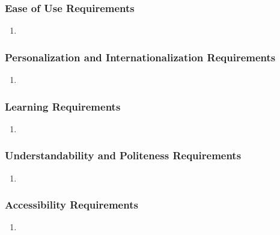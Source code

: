 \documentclass[]{article}
\begin{document}
\subsubsection{Ease of Use Requirements}
\label{ssub:ease_of_use_requirements}
\begin{enumerate}[{UH}1. ]
	\item 
\end{enumerate}

\subsubsection{Personalization and Internationalization Requirements}
\label{ssub:personalization_and_internationalization_requirements}
\begin{enumerate}[{UH}1. ]
	\item 
\end{enumerate}

\subsubsection{Learning Requirements}
\label{ssub:learning_requirements}
\begin{enumerate}[{UH}1. ]
	\item 
\end{enumerate}

\subsubsection{Understandability and Politeness Requirements}
\label{ssub:understandability_and_politeness_requirements}
\begin{enumerate}[{UH}1. ]
	\item 
\end{enumerate}

\subsubsection{Accessibility Requirements}
\label{ssub:accessibility_requirements}
\begin{enumerate}[{UH}1. ]
	\item 
\end{enumerate}

\end{document}
